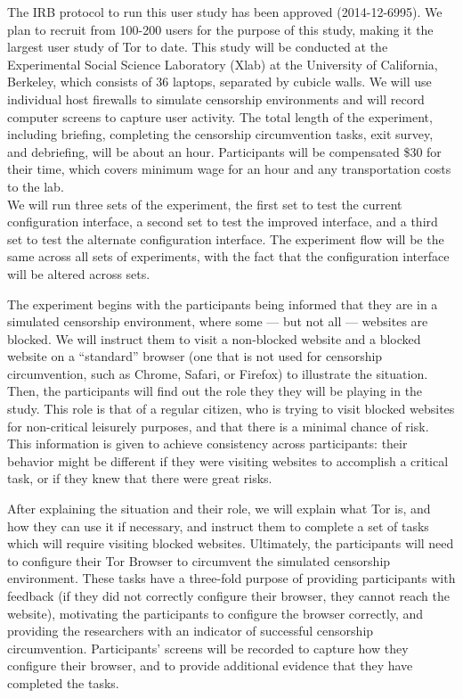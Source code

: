 \documentclass{template}
\begin{document}
The IRB protocol to run this user study has been approved (2014-12-6995). 
We plan to recruit from 100-200 users for the purpose of this study, 
making it the largest user study of Tor to date.  This study will be conducted at the
Experimental Social Science Laboratory (Xlab)
at the University of California, Berkeley, which consists of 36 laptops,
separated by cubicle walls. We will use individual host firewalls to simulate
censorship environments and will record computer screens to capture 
user activity. The total length of the experiment, including briefing, completing the censorship 
circumvention tasks, exit survey, and debriefing, will be about an hour.
Participants will be compensated \$30 for their time, which covers
minimum wage for an hour and any transportation costs to the lab.  \\

We will run three sets of the experiment, the first set to test the current configuration
interface, a second set to test the improved interface, and a third set to test the 
alternate configuration interface. The experiment flow will be the same across all 
sets of experiments, with the fact that the configuration interface will be altered 
across sets. 

The experiment begins with the participants being informed that they are in a
simulated censorship
environment, where some --- but not all --- websites are blocked. We will
instruct them to visit a non-blocked website and a blocked website on a
``standard'' browser (one that is not used for censorship circumvention, such
as Chrome, Safari, or Firefox) to illustrate the situation.
Then, the participants will find out the role they they will be playing in the study.
This role is that of a regular citizen, who is trying to visit blocked websites
for non-critical leisurely purposes,
and that there is a minimal chance of risk. This information is given
to achieve
consistency across participants: their behavior might be different if they were
visiting websites to accomplish a critical task, or if they knew that there
were great risks. 

After explaining the situation and their role, we will explain what Tor is, and
how they can use it if necessary, and instruct them to complete a set of
tasks which will require visiting blocked websites. Ultimately, the
participants will need to configure their Tor Browser to circumvent the
simulated censorship environment. These tasks have a three-fold purpose of
providing participants with feedback (if they did not correctly configure their
browser, they cannot reach the website),  motivating the participants to
configure the browser correctly, and providing the researchers with an
indicator of successful censorship circumvention.
Participants' screens will be recorded to capture how they configure
their browser, and to provide additional evidence that they have completed the
tasks.
\end{document}
